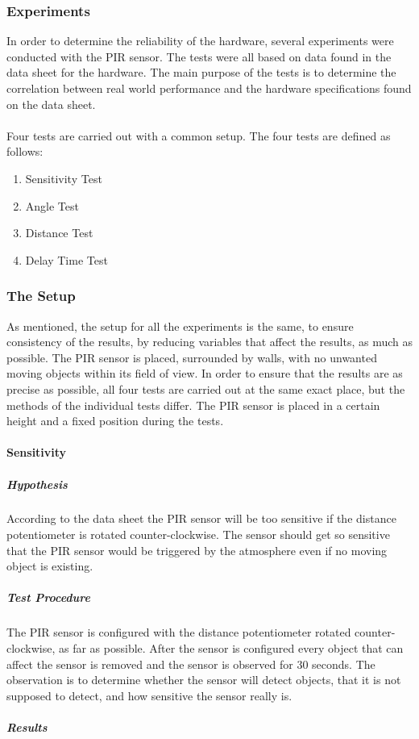\subsubsection{Experiments}
\label{sub:Experiments}
In order to determine the reliability of the hardware, several experiments were conducted with the PIR sensor.
The tests were all based on data found in the data sheet for the hardware.
The main purpose of the tests is to determine the correlation between real world performance and the hardware specifications
found on the data sheet.
\\\\
Four tests are carried out with a common setup. The four tests are defined as follows:

\begin{enumerate}
  \item Sensitivity Test
  \item Angle Test
  \item Distance Test
  \item Delay Time Test
\end{enumerate}

\subsubsection{The Setup}
\label{subs:The Setup}
As mentioned, the setup for all the experiments is the same, to ensure
consistency of the results, by reducing variables that affect the results, as
much as possible. The PIR sensor is placed, surrounded by walls, with no unwanted
moving objects within its field of view. In order to ensure that the results are
as precise as possible, all four tests are carried out at the same exact place,
but the methods of the individual tests differ. The PIR sensor is placed in a
certain height and a fixed position during the tests.

\paragraph{Sensitivity}
\label{par:Sensitivity}

\subparagraph{Hypothesis}
\label{subp:SenHypothesis}
According to the data sheet the PIR sensor will be too sensitive if the distance potentiometer is rotated counter-clockwise.
The sensor should get so sensitive that the PIR sensor would be triggered by the atmosphere even
if no moving object is existing\cite{datasheet_pir1}.
\subparagraph{Test Procedure}
\label{subp:SenTest Procedure}
The PIR sensor is configured with the distance potentiometer rotated
counter-clockwise, as far as possible.
After the sensor is configured every object that can affect the sensor is
removed and the sensor is observed for 30 seconds.
The observation is to determine whether the sensor will detect objects, that it is not
supposed to detect, and how sensitive the sensor really is.
\subparagraph{Results}
\label{subp:SenResults}

